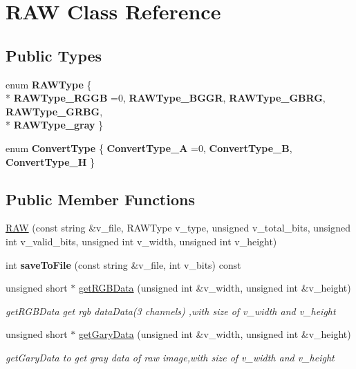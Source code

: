 \hypertarget{classRAW}{\section{R\-A\-W Class Reference}
\label{classRAW}
}
\subsection*{Public Types}
\begin{DoxyCompactItemize}
\item 
enum {\bfseries R\-A\-W\-Type} \{ \\*
{\bfseries R\-A\-W\-Type\-\_\-\-R\-G\-G\-B} =0, 
{\bfseries R\-A\-W\-Type\-\_\-\-B\-G\-G\-R}, 
{\bfseries R\-A\-W\-Type\-\_\-\-G\-B\-R\-G}, 
{\bfseries R\-A\-W\-Type\-\_\-\-G\-R\-B\-G}, 
\\*
{\bfseries R\-A\-W\-Type\-\_\-gray}
 \}
\item 
enum {\bfseries Convert\-Type} \{ {\bfseries Convert\-Type\-\_\-\-A} =0, 
{\bfseries Convert\-Type\-\_\-\-B}, 
{\bfseries Convert\-Type\-\_\-\-H}
 \}
\end{DoxyCompactItemize}
\subsection*{Public Member Functions}
\begin{DoxyCompactItemize}
\item 
\hyperlink{classRAW_a9608d8a97fad45f19ef8316cd4e35524}{R\-A\-W} (const string \&v\-\_\-file, R\-A\-W\-Type v\-\_\-type, unsigned v\-\_\-total\-\_\-bits, unsigned int v\-\_\-valid\-\_\-bits, unsigned int v\-\_\-width, unsigned int v\-\_\-height)
\item 
\hypertarget{classRAW_a4b827deaa5c6b22c882ec9c26bebc351}{int {\bfseries save\-To\-File} (const string \&v\-\_\-file, int v\-\_\-bits) const }\label{classRAW_a4b827deaa5c6b22c882ec9c26bebc351}

\item 
unsigned short $\ast$ \hyperlink{classRAW_ae2f981724b4c1be2682e07ecc84890ed}{get\-R\-G\-B\-Data} (unsigned int \&v\-\_\-width, unsigned int \&v\-\_\-height)
\begin{DoxyCompactList}\small\item\em get\-R\-G\-B\-Data get rgb data\-Data(3 channels) ,with size of v\-\_\-width and v\-\_\-height \end{DoxyCompactList}\item 
unsigned short $\ast$ \hyperlink{classRAW_a887cdab46b22e9caa7fe27e024311224}{get\-Gary\-Data} (unsigned int \&v\-\_\-width, unsigned int \&v\-\_\-height)
\begin{DoxyCompactList}\small\item\em get\-Gary\-Data to get gray data of raw image,with size of v\-\_\-width and v\-\_\-height \end{DoxyCompactList}\end{DoxyCompactItemize}
